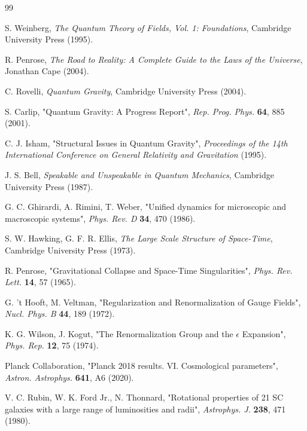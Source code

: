 \begin{thebibliography}{99}

S. Weinberg, \emph{The Quantum Theory of Fields, Vol. 1: Foundations}, Cambridge University Press (1995).

R. Penrose, \emph{The Road to Reality: A Complete Guide to the Laws of the Universe}, Jonathan Cape (2004).

C. Rovelli, \emph{Quantum Gravity}, Cambridge University Press (2004).

S. Carlip, "Quantum Gravity: A Progress Report", \emph{Rep. Prog. Phys.} \textbf{64}, 885 (2001).

C. J. Isham, "Structural Issues in Quantum Gravity", \emph{Proceedings of the 14th International Conference on General Relativity and Gravitation} (1995).

J. S. Bell, \emph{Speakable and Unspeakable in Quantum Mechanics}, Cambridge University Press (1987).

G. C. Ghirardi, A. Rimini, T. Weber, "Unified dynamics for microscopic and macroscopic systems", \emph{Phys. Rev. D} \textbf{34}, 470 (1986).

S. W. Hawking, G. F. R. Ellis, \emph{The Large Scale Structure of Space-Time}, Cambridge University Press (1973).

R. Penrose, "Gravitational Collapse and Space-Time Singularities", \emph{Phys. Rev. Lett.} \textbf{14}, 57 (1965).

G. 't Hooft, M. Veltman, "Regularization and Renormalization of Gauge Fields", \emph{Nucl. Phys. B} \textbf{44}, 189 (1972).

K. G. Wilson, J. Kogut, "The Renormalization Group and the $\epsilon$ Expansion", \emph{Phys. Rep.} \textbf{12}, 75 (1974).

Planck Collaboration, "Planck 2018 results. VI. Cosmological parameters", \emph{Astron. Astrophys.} \textbf{641}, A6 (2020).

V. C. Rubin, W. K. Ford Jr., N. Thonnard, "Rotational properties of 21 SC galaxies with a large range of luminosities and radii", \emph{Astrophys. J.} \textbf{238}, 471 (1980).


\end{thebibliography}
